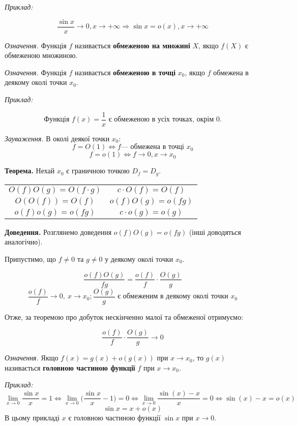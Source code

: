 \documentclass[12pt]{report}
\begin{document}
\textit{Приклад:}

$$\frac{\sin x}{x} \to 0, x \to +\infty \Longrightarrow \sin x = o(x), x \to +\infty$$

\vspace{5mm}

\textit{Означення.} Функція $f$ називається \textbf{обмеженою на множині} $X$, якщо $f(X)$ є обмеженою множиною.

\textit{Означення.} Функція $f$ називається \textbf{обмеженою в точці} $x_0$, якщо $f$ обмежена в деякому околі точки $x_0$.

\textit{Приклад:}

$$\textrm{Функція } f(x) = \frac{1}{x} \textrm{ є обмеженою в усіх точках, окрім $0$.}$$

\textit{Зауваження.} В околі деякої точки $x_0$:
$$f = O(1) \Longleftrightarrow f \textrm{--- обмежена в точці $x_0$}$$
$$f = o(1) \Longleftrightarrow f \to 0, x \to x_0$$

\textbf{Теорема.} Нехай $x_0$ є граничною точкою $D_f = D_g.$

\vspace{3mm}
\setlength{\tabcolsep}{5mm}
\begin{tabular}{c     c}
    $O(f)O(g) = O(f\cdot g)$ &  $c \cdot O(f) = O(f)$\\
    $O(O(f)) = O(f)$& $o(f)O(g) = o(f g)$\\
    $o(f)o(g) = o(f g)$ & $c \cdot o(g) = o(g)$
\end{tabular}

\textbf{Доведення.} Розглянемо доведення $o(f)O(g) = o(fg)$ (інші доводяться аналогічно). 

Припустимо, що $f \neq 0$ та $g \neq 0$ у деякому околі точки $x_0$.

$$\frac{o(f)O(g)}{f g} = \frac{o(f)}{f} \cdot \frac{O(g)}{g}$$
$$\frac{o(f)}{f} \to 0,\ x \to x_0; \frac{O(g)}{g} \textrm{ є обмеженим в деякому околі точки $x_0$}$$

Отже, за теоремою про добуток нескінченно малої та обмеженої отримуємо:

$$\frac{o(f)}{f} \cdot \frac{O(g)}{g} \to 0$$

\textit{Означення.} Якщо $f(x) = g(x) + o(g(x))$ при $x \to x_0$, то $g(x)$ називається \textbf{головною частиною функції} $f$ при $x \to x_0$.

\textit{Приклад:}
$$\lim_{x\to 0}\frac{\sin x}{x} = 1 \Longleftrightarrow \lim_{x\to 0}\Big(\frac{\sin x}{x} - 1\Big) = 0 \Longleftrightarrow \lim_{x\to 0}\frac{\sin (x) - x}{x} = 0 \Longleftrightarrow \sin (x) - x = o(x)$$
$$\sin x = x + o(x)$$
В цьому прикладі $x$ є головною частиною функції $\sin x$ при $x \to 0$.
\end{document}
